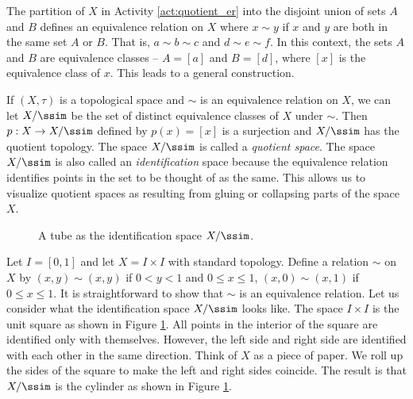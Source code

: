 
The partition of $X$ in Activity \ref{act:quotient_er} into the disjoint union of sets $A$ and $B$ defines an equivalence relation on $X$ where $x \sim y$ if $x$ and $y$ are both in the same set $A$ or $B$. That is, $a \sim b \sim c$ and $d \sim e \sim f$. In this context, the sets $A$ and $B$ are equivalence classes -- $A = [a]$ and $B = [d]$, where $[x]$ is the equivalence class of $x$. This leads to a general construction.

If $(X, \tau)$ is a topological space and $\sim$ is an equivalence relation on $X$, we can let $X/\ssim$ be the set of distinct equivalence classes of $X$ under $\sim$. Then $p: X \to X/\ssim$ defined by $p(x) = [x]$ is a surjection and $X/\ssim$ has the quotient topology. The space $X/\ssim$ is called a \emph{quotient space}. The space $X/\ssim$ is also called an \emph{identification} space because the equivalence relation identifies points in the set to be thought of as the same. This allows us to visualize quotient spaces as resulting from gluing or collapsing parts of the space $X$.

\begin{figure}[h]
\begin{center}
\caption{A tube as the identification space $X/\ssim$.} 
\label{F:Quotient_tube}
\end{center}
\end{figure}

\begin{example} Let $I = [0,1]$ and let $X = I \times I$ with standard topology. Define a relation $\sim$ on $X$ by $(x,y) \sim (x,y)$ if $0 < y < 1$ and $0 \leq x \leq 1$, $(x,0) \sim (x,1)$ if $0 \leq x \leq 1$. It is straightforward to show that $\sim$ is an equivalence relation. Let us consider what the identification space $X/\ssim$ looks like. The space $I \times I$ is the unit square as shown in Figure \ref{F:Quotient_tube}. All points in the interior of the square are identified only with themselves. However, the left side and right side are identified with each other in the same direction. Think of $X$ as a piece of paper. We roll up the sides of the square to make the left and right sides coincide. The result is that $X/\ssim$ is the cylinder as shown in Figure \ref{F:Quotient_tube}. 

\end{example}

